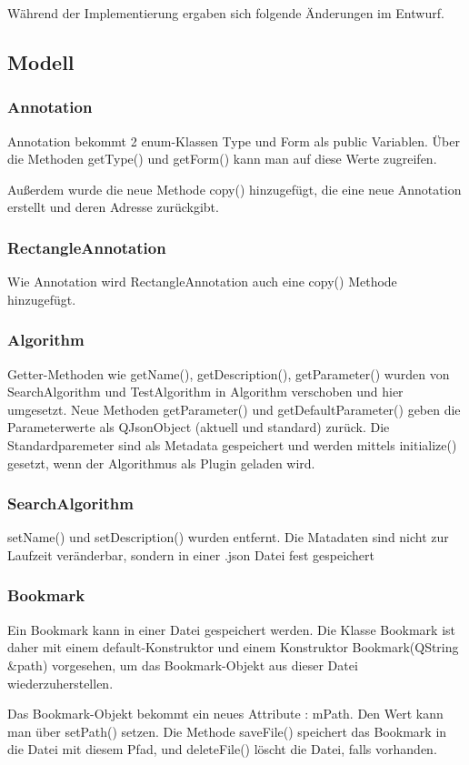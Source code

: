 Während der Implementierung ergaben sich folgende Änderungen im Entwurf.

\subsection{Modell}
\subsubsection{Annotation}
Annotation bekommt 2 enum-Klassen Type und Form als public Variablen. Über die Methoden getType() und getForm() kann man auf diese Werte zugreifen.

Außerdem wurde die neue Methode copy() hinzugefügt, die eine neue Annotation erstellt und deren Adresse zurückgibt. 

\subsubsection{RectangleAnnotation}
Wie Annotation wird RectangleAnnotation auch eine copy() Methode hinzugefügt.

\subsubsection{Algorithm}
Getter-Methoden wie getName(), getDescription(), getParameter() wurden von SearchAlgorithm und TestAlgorithm in Algorithm verschoben und hier umgesetzt.
Neue Methoden getParameter() und getDefaultParameter() geben die Parameterwerte als QJsonObject (aktuell und standard) zurück. Die Standardparemeter sind als Metadata gespeichert und werden mittels initialize() gesetzt, wenn der Algorithmus als Plugin geladen wird.
\subsubsection{SearchAlgorithm}
setName() und setDescription() wurden entfernt. Die Matadaten sind nicht zur Laufzeit veränderbar, sondern in einer .json Datei fest gespeichert

\subsubsection{Bookmark}
Ein Bookmark kann in einer Datei gespeichert werden. Die Klasse Bookmark ist daher mit einem default-Konstruktor und einem Konstruktor Bookmark(QString &path) vorgesehen, um das Bookmark-Objekt aus dieser Datei wiederzuherstellen.

Das Bookmark-Objekt bekommt ein neues Attribute : mPath. Den Wert kann man über setPath() setzen. Die Methode saveFile() speichert das Bookmark in die Datei mit diesem Pfad, und deleteFile() löscht die Datei, falls vorhanden.

